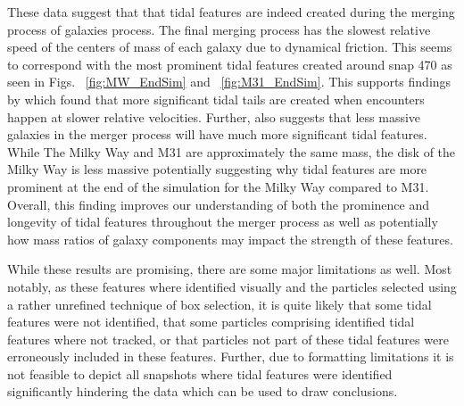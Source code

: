 \documentclass[fleqn,usenatbib]{mnras}
\begin{document}
These data suggest that that tidal features are indeed created during the merging process of galaxies process. The final merging process has the slowest relative speed of the centers of mass of each galaxy due to dynamical friction. This seems to correspond with the most prominent tidal features created around snap 470 as seen in Figs. ~\ref{fig:MW_EndSim} and ~\ref{fig:M31_EndSim}. This supports findings by \cite{Ji_Peirani_Yi_2014} which found that more significant tidal tails are created when encounters happen at slower relative velocities. Further, \cite{Ji_Peirani_Yi_2014} also suggests that less massive galaxies in the merger process will have much more significant tidal features. While The Milky Way and M31 are approximately the same mass, the disk of the Milky Way is less massive potentially suggesting why tidal features are more prominent at the end of the simulation for the Milky Way compared to M31. Overall, this finding improves our understanding of both the prominence and longevity of tidal features throughout the merger process as well as potentially how mass ratios of galaxy components may impact the strength of these features.

While these results are promising, there are some major limitations as well. Most notably, as these features where identified visually and the particles selected using a rather unrefined technique of box selection, it is quite likely that some tidal features were not identified, that some particles comprising identified tidal features where not tracked, or that particles not part of these tidal features were erroneously included in these features. Further, due to formatting limitations it is not feasible to depict all snapshots where tidal features were identified significantly hindering the data which can be used to draw conclusions.
\end{document}
